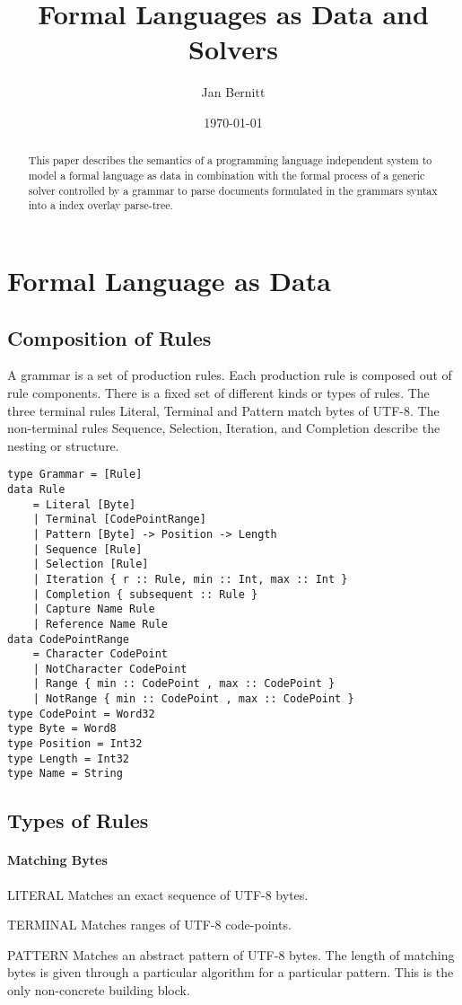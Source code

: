 \documentclass[10pt,a4paper]{article}
\begin{document}
\lstset{language=Haskell}
\title{Formal Languages as Data and Solvers}
\author{Jan Bernitt}
\date{\today}
\maketitle

\begin{abstract}
\noindent This paper describes the semantics of a programming language independent system to model a formal language as data in combination with the formal process of a generic solver controlled by a grammar to parse documents formulated in the grammars syntax into a index overlay parse-tree.
\end{abstract}
\section{Formal Language as Data}
\subsection{Composition of Rules}
A grammar is a set of production rules. Each production rule is composed out of rule components. There is a fixed set of different kinds or types of rules. The three terminal rules Literal, Terminal and Pattern match bytes of UTF-8. The non-terminal rules Sequence, Selection, Iteration, and Completion describe the nesting or structure.

\begin{lstlisting}
type Grammar = [Rule]
data Rule
	= Literal [Byte]
	| Terminal [CodePointRange]
	| Pattern [Byte] -> Position -> Length
	| Sequence [Rule]
	| Selection [Rule]
	| Iteration { r :: Rule, min :: Int, max :: Int }
	| Completion { subsequent :: Rule }
	| Capture Name Rule
	| Reference Name Rule
data CodePointRange
	= Character CodePoint
	| NotCharacter CodePoint
	| Range { min :: CodePoint , max :: CodePoint }
	| NotRange { min :: CodePoint , max :: CodePoint }
type CodePoint = Word32
type Byte = Word8
type Position = Int32
type Length = Int32
type Name = String
\end{lstlisting}

\subsection{Types of Rules}
\paragraph{Matching Bytes}
\begin{rulelist}
\item[LITERAL] Matches an exact sequence of UTF-8 bytes.

\item[TERMINAL] Matches ranges of UTF-8 code-points.

\item[PATTERN] Matches an abstract pattern of UTF-8 bytes. The length of matching bytes is given through a particular algorithm for a particular pattern. This is the only non-concrete building block.
\end{rulelist}
\end{document}
